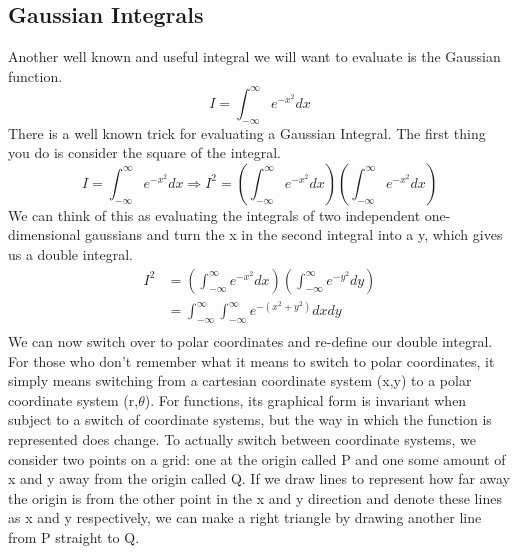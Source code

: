 \documentclass{article}
\newcommand{\be}{\begin{equation}}
\newcommand{\ee}{\end{equation}}
\begin{document}
\subsection*{Gaussian Integrals}
Another well known and useful integral we will want to evaluate is the Gaussian function.
\be
I = \int_{-\infty}^\infty e^{-x^2} dx
\ee
There is a well known trick for evaluating a Gaussian Integral.
The first thing you do is consider the square of the integral.
\be
	I = \int_{-\infty}^\infty e^{-x^2} dx \Rightarrow I^2 = \left(\int_{-\infty}^\infty e^{-x^2} dx \right) \left(\int_{-\infty}^\infty e^{-x^2} dx\right)
\ee
We can think of this as evaluating the integrals of two independent one-dimensional gaussians and turn the x in the second integral into a y, which gives us a double integral.
\be
\begin{split}
I^2 &= \left(\int_{-\infty}^\infty e^{-x^2} dx \right) \left(\int_{-\infty}^\infty e^{-y^2} dy\right) \\
&= \int_{-\infty}^\infty \int_{-\infty}^\infty e^{-(x^2 + y^2)} dxdy \\
\end{split}
\ee
We can now switch over to polar coordinates and re-define our double integral.
For those who don't remember what it means to switch to polar coordinates, it simply means switching from a cartesian coordinate system (x,y) to a polar coordinate system (r,$\theta$).
For functions, its graphical form is invariant when subject to a switch of coordinate systems, but the way in which the function is represented does change.
To actually switch between coordinate systems, we consider two points on a grid: one at the origin called P and one some amount of x and y away from the origin called Q.
If we draw lines to represent how far away the origin is from the other point in the x and y direction and denote these lines as x and y respectively, we can make a right triangle by drawing another line from P straight to Q.
\end{document}
